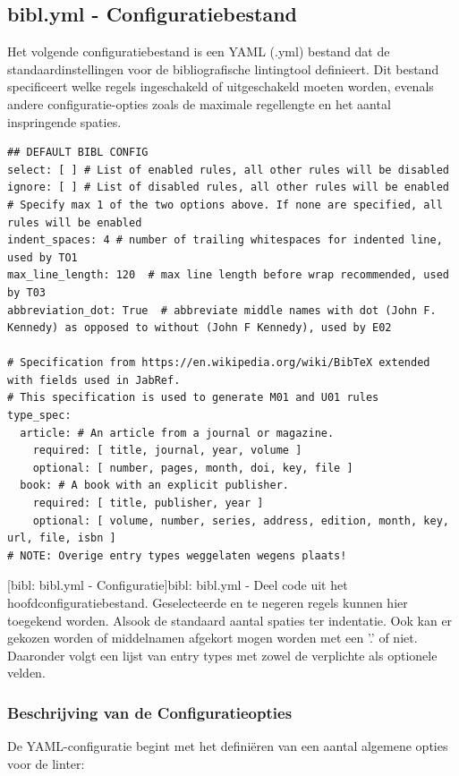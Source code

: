 \subsection{bibl.yml - Configuratiebestand}
Het volgende configuratiebestand is een YAML (.yml) bestand dat de standaardinstellingen voor de bibliografische lintingtool definieert. Dit bestand specificeert welke regels ingeschakeld of uitgeschakeld moeten worden, evenals andere configuratie-opties zoals de maximale regellengte en het aantal inspringende spaties.

\begin{verbatim}
## DEFAULT BIBL CONFIG
select: [ ] # List of enabled rules, all other rules will be disabled
ignore: [ ] # List of disabled rules, all other rules will be enabled
# Specify max 1 of the two options above. If none are specified, all rules will be enabled
indent_spaces: 4 # number of trailing whitespaces for indented line, used by TO1
max_line_length: 120  # max line length before wrap recommended, used by T03
abbreviation_dot: True  # abbreviate middle names with dot (John F. Kennedy) as opposed to without (John F Kennedy), used by E02

# Specification from https://en.wikipedia.org/wiki/BibTeX extended with fields used in JabRef.
# This specification is used to generate M01 and U01 rules
type_spec:
  article: # An article from a journal or magazine.
    required: [ title, journal, year, volume ]
    optional: [ number, pages, month, doi, key, file ]
  book: # A book with an explicit publisher.
    required: [ title, publisher, year ]
    optional: [ volume, number, series, address, edition, month, key, url, file, isbn ]
# NOTE: Overige entry types weggelaten wegens plaats!
\end{verbatim}
[bibl: bibl.yml - Configuratie]{bibl: bibl.yml - Deel code uit het hoofdconfiguratiebestand. Geselecteerde en te negeren regels kunnen hier toegekend worden. Alsook de standaard aantal spaties ter indentatie. Ook kan er gekozen worden of middelnamen afgekort mogen worden met een '.' of niet. Daaronder volgt een lijst van entry types met zowel de verplichte als optionele velden. \label{lst:bibl_config}}

\subsubsection{Beschrijving van de Configuratieopties}

De YAML-configuratie begint met het definiëren van een aantal algemene opties voor de linter:

